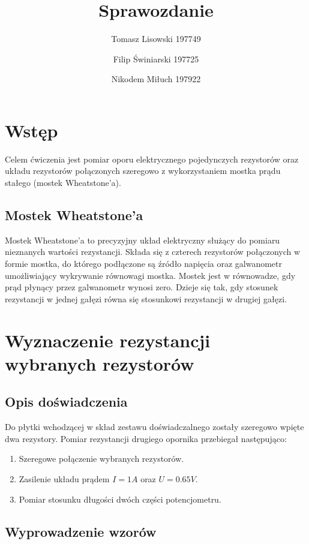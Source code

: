 \documentclass{article} %
\title{Sprawozdanie}
\author{Tomasz Lisowski 197749\and Filip Świniarski 197725\and Nikodem Miłuch 197922}
\begin{document}
\maketitle

\section{Wstęp}

Celem ćwiczenia jest pomiar oporu elektrycznego pojedynczych rezystorów
oraz układu rezystorów połączonych szeregowo z wykorzystaniem mostka prądu stałego (mostek Wheatstone’a).

\subsection{Mostek Wheatstone'a}

Mostek Wheatstone’a to precyzyjny układ elektryczny służący do pomiaru nieznanych wartości rezystancji. Składa się z czterech rezystorów połączonych w formie mostka, do którego podłączone są źródło napięcia oraz galwanometr umożliwiający wykrywanie równowagi mostka. Mostek jest w równowadze, gdy prąd płynący przez galwanometr wynosi zero. Dzieje się tak, gdy stosunek rezystancji w jednej gałęzi równa się stosunkowi rezystancji w drugiej gałęzi.

\section{Wyznaczenie rezystancji wybranych rezystorów}

\subsection{Opis doświadczenia}

Do płytki wchodzącej w skład zestawu doświadczalnego zostały szeregowo wpięte dwa rezystory. Pomiar rezystancji drugiego opornika przebiegał następująco:
{\begin{enumerate}
    \item Szeregowe połączenie wybranych rezystorów.
    \item Zasilenie układu prądem $I = 1A$ oraz $U = 0.65V$.
    \item Pomiar stosunku długości dwóch części potencjometru.
\end{enumerate}
}

\subsection{Wyprowadzenie wzorów}
\end{document}
